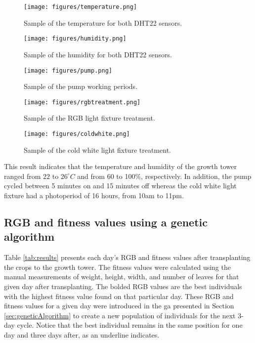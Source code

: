 \documentclass[preprint, review, 12pt]{elsarticle}
\begin{document}
\begin{figure}
    \centering
    \texttt{[image: figures/temperature.png]}
    \caption{Sample of the temperature for both DHT22 sensors.}
    \label{fig:dht22-temp}
\end{figure}


\begin{figure}
    \centering
    \texttt{[image: figures/humidity.png]}
    \caption{Sample of the humidity for both DHT22 sensors.}
    \label{fig:dht22-humid}
\end{figure}


\begin{figure}
    \centering
    \texttt{[image: figures/pump.png]}
    \caption{Sample of the pump working periods.}
    \label{fig:pump}
\end{figure}

\begin{figure}
    \centering
    \texttt{[image: figures/rgbtreatment.png]}
    \caption{Sample of the RGB light fixture treatment.}
    \label{fig:rgbtreatment}
\end{figure}

\begin{figure}
    \centering
    \texttt{[image: figures/coldwhite.png]}
    \caption{Sample of the cold white light fixture treatment.}
    \label{fig:coldtreatment}
\end{figure}

This result indicates that the temperature and humidity of the growth tower ranged from $22$ to $26^{\circ}C$ and from 60 to 100\%, respectively. In addition, the pump cycled between 5 minutes on and 15 minutes off whereas the cold white light fixture had a photoperiod of 16 hours, from 10am to 11pm. 

\subsection{RGB and fitness values using a genetic algorithm}
\label{sec:resultsGeneticAlgorithm}

Table \ref{tab:results} presents each day's RGB and fitness values after transplanting the crops to the growth tower. The fitness values were calculated using the manual measurements of weight, height, width, and number of leaves for that given day after transplanting. The bolded RGB values are the best individuals with the highest fitness value found on that particular day. These RGB and fitness values for a given day were introduced in the \gls{ga} presented in Section \ref{sec:geneticAlgorithm} to create a new population of individuals for the next 3-day cycle. Notice that the best individual remains in the same position for one day and three days after, as an underline indicates. 
\end{document}
